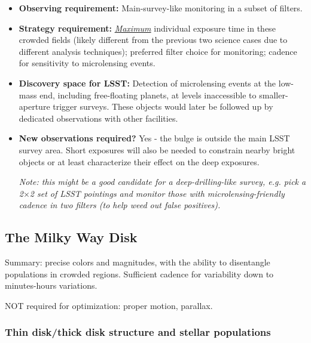 \begin{itemize}
\item {\bf Observing requirement:} Main-survey-like monitoring in a subset of filters.
\vspace{-2mm}

\item {\bf Strategy requirement:} \underline{\it Maximum} individual exposure time in these crowded fields (likely different from the previous two science cases due to different analysis techniques); preferred filter choice for monitoring; cadence for sensitivity to microlensing events.
\vspace{-2mm}

\item {\bf Discovery space for LSST:} Detection of microlensing events at the low-mass end, including free-floating planets, at levels inaccessible to smaller-aperture trigger surveys. These objects would later be followed up by dedicated observations with other facilities. 
\vspace{-2mm}

\item {\bf New observations required?} Yes - the bulge is outside the main LSST survey area. Short exposures will also be needed to constrain nearby bright objects or at least characterize their effect on the deep exposures. 

{\it Note: this might be a good candidate for a deep-drilling-like survey, e.g. pick a 2$\times$2 set of LSST pointings and monitor those with microlensing-friendly cadence in two filters (to help weed out false positives).} 

\vspace{-2mm}
\end{itemize}

\subsection{The Milky Way Disk}

Summary: precise colors and magnitudes, with the ability to
disentangle populations in crowded regions. Sufficient cadence for
variability down to minutes-hours variations.

NOT required for optimization: proper motion, parallax.

\subsubsection{Thin disk/thick disk structure and stellar populations}

